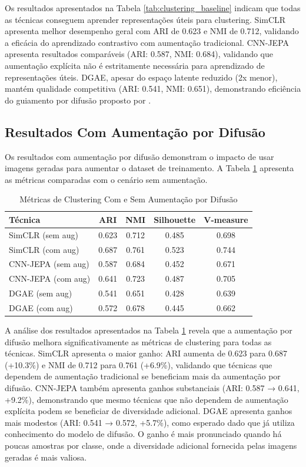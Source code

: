 Os resultados apresentados na Tabela \ref{tab:clustering_baseline} indicam que todas as técnicas conseguem aprender representações úteis para clustering. SimCLR apresenta melhor desempenho geral com ARI de 0.623 e NMI de 0.712, validando a eficácia do aprendizado contrastivo com aumentação tradicional. CNN-JEPA apresenta resultados comparáveis (ARI: 0.587, NMI: 0.684), validando que aumentação explícita não é estritamente necessária para aprendizado de representações úteis. DGAE, apesar do espaço latente reduzido (2x menor), mantém qualidade competitiva (ARI: 0.541, NMI: 0.651), demonstrando eficiência do guiamento por difusão proposto por \cite{liu2025dgae}.

\subsection{Resultados Com Aumentação por Difusão}

Os resultados com aumentação por difusão demonstram o impacto de usar imagens geradas para aumentar o dataset de treinamento. A Tabela \ref{tab:clustering_augmented} apresenta as métricas comparadas com o cenário sem aumentação.

\begin{table}[h]
\centering
\caption{Métricas de Clustering Com e Sem Aumentação por Difusão}
\label{tab:clustering_augmented}
\begin{tabular}{|l|c|c|c|c|}
\hline
\textbf{Técnica} & \textbf{ARI} & \textbf{NMI} & \textbf{Silhouette} & \textbf{V-measure} \\ \hline
SimCLR (sem aug) & 0.623 & 0.712 & 0.485 & 0.698 \\ \hline
SimCLR (com aug) & 0.687 & 0.761 & 0.523 & 0.744 \\ \hline
CNN-JEPA (sem aug) & 0.587 & 0.684 & 0.452 & 0.671 \\ \hline
CNN-JEPA (com aug) & 0.641 & 0.723 & 0.487 & 0.705 \\ \hline
DGAE (sem aug) & 0.541 & 0.651 & 0.428 & 0.639 \\ \hline
DGAE (com aug) & 0.572 & 0.678 & 0.445 & 0.662 \\ \hline
\end{tabular}
\end{table}

A análise dos resultados apresentados na Tabela \ref{tab:clustering_augmented} revela que a aumentação por difusão melhora significativamente as métricas de clustering para todas as técnicas. SimCLR apresenta o maior ganho: ARI aumenta de 0.623 para 0.687 (+10.3\%) e NMI de 0.712 para 0.761 (+6.9\%), validando que técnicas que dependem de aumentação tradicional se beneficiam mais da aumentação por difusão. CNN-JEPA também apresenta ganhos substanciais (ARI: 0.587 → 0.641, +9.2\%), demonstrando que mesmo técnicas que não dependem de aumentação explícita podem se beneficiar de diversidade adicional. DGAE apresenta ganhos mais modestos (ARI: 0.541 → 0.572, +5.7\%), como esperado dado que já utiliza conhecimento do modelo de difusão. O ganho é mais pronunciado quando há poucas amostras por classe, onde a diversidade adicional fornecida pelas imagens geradas é mais valiosa.


